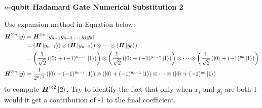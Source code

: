 \documentclass[a4paper, 10pt]{article}
\begin{document}
\begin{problem}
\textbf{\( n \)-qubit Hadamard Gate Numerical Substitution 2}
\par Use expansion method in Equation below:
\begin{align*}
	\textbf{\textit{H}}^{\otimes n} \ket{y} & = \textbf{\textit{H}}^{\otimes n} \ket{y_{n-1} y_{n-2} \dots y_1 y_0}                                                                                                                                                                         \\
	                                        & = \left(\textbf{\textit{H}} \ket{y_{n-1}}\right) \otimes \left(\textbf{\textit{H}} \ket{y_{n-2}}\right) \otimes \dots \otimes \left(\textbf{\textit{H}} \ket{y_0}\right)                                                                                     \\
	                                        & = \left(\frac{1}{\sqrt{2}} \left( \ket{0} + (-1)^{y_{n-1}} \ket{1} \right)\right) \otimes \left(\frac{1}{\sqrt{2}} \left( \ket{0} + (-1)^{y_{n-2}} \ket{1} \right)\right) \otimes \dots \otimes \left(\frac{1}{\sqrt{2}} \left( \ket{0} + (-1)^{y_0} \ket{1} \right)\right) \\
	\textbf{\textit{H}}^{\otimes n} \ket{y} & = \frac{1}{2^{n/2}} \left( \ket{0} + (-1)^{y_{n-1}} \ket{1} \right) \otimes \left( \ket{0} + (-1)^{y_{n-2}} \ket{1} \right) \otimes \dots \otimes \left( \ket{0} + (-1)^{y_0} \ket{1} \right)
\end{align*}
to compute \( \textbf{\textit{H}}^{\otimes 2} \ket{2} \).
Try to identify the fact that only when \( x_i \) and \( y_i \) are both 1 would it get a contribution of -1 to the final coefficient.
\end{problem}
\end{document}

